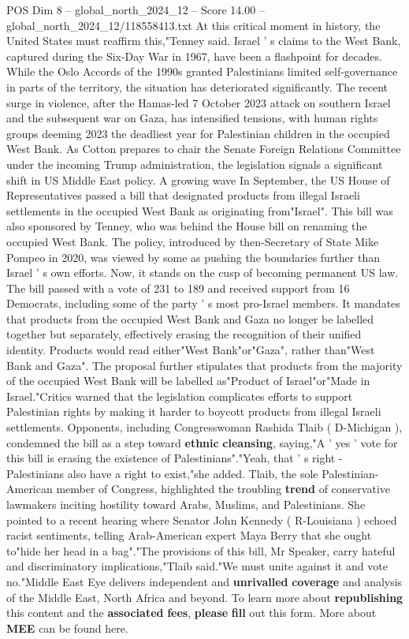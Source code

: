 \begin{textsample}{POS Dim 8 – global\_north\_2024\_12 – Score 14.00 – global\_north\_2024\_12/118558413.txt}
At this critical moment in history, the United States must reaffirm this,"Tenney said.
Israel ' s claims to the West Bank, captured during the Six-Day War in 1967, have been a flashpoint for decades.
While the Oslo Accords of the 1990s granted Palestinians limited self-governance in parts of the territory, the situation has deteriorated significantly.
The recent surge in violence, after the Hamas-led 7 October 2023 attack on southern Israel and the subsequent war on Gaza, has intensified tensions, with human rights groups deeming 2023 the deadliest year for Palestinian children in the occupied West Bank.
As Cotton prepares to chair the Senate Foreign Relations Committee under the incoming Trump administration, the legislation signals a significant shift in US Middle East policy.
A growing wave In September, the US House of Representatives passed a bill that designated products from illegal Israeli settlements in the occupied West Bank as originating from"Israel".
This bill was also sponsored by Tenney, who was behind the House bill on renaming the occupied West Bank.
The policy, introduced by then-Secretary of State Mike Pompeo in 2020, was viewed by some as pushing the boundaries further than Israel ' s own efforts.
Now, it stands on the cusp of becoming permanent US law.
The bill passed with a vote of 231 to 189 and received support from 16 Democrats, including some of the party ' s most pro-Israel members.
It mandates that products from the occupied West Bank and Gaza no longer be labelled together but separately, effectively erasing the recognition of their unified identity.
Products would read either"West Bank"or"Gaza", rather than"West Bank and Gaza".
The proposal further stipulates that products from the majority of the occupied West Bank will be labelled as"Product of Israel"or"Made in Israel."Critics warned that the legislation complicates efforts to support Palestinian rights by making it harder to boycott products from illegal Israeli settlements.
Opponents, including Congresswoman Rashida Tlaib ( D-Michigan ), condemned the bill as a step toward \textbf{ethnic} \textbf{cleansing}, saying,"A ' yes ' vote for this bill is erasing the existence of Palestinians"."Yeah, that ' s right - Palestinians also have a right to exist,"she added.
Tlaib, the sole Palestinian-American member of Congress, highlighted the troubling \textbf{trend} of conservative lawmakers inciting hostility toward Arabs, Muslims, and Palestinians.
She pointed to a recent hearing where Senator John Kennedy ( R-Louisiana ) echoed racist sentiments, telling Arab-American expert Maya Berry that she ought to"hide her head in a bag"."The provisions of this bill, Mr Speaker, carry hateful and discriminatory implications,"Tlaib said."We must unite against it and vote no."Middle East Eye delivers independent and \textbf{unrivalled} \textbf{coverage} and analysis of the Middle East, North Africa and beyond.
To learn more about \textbf{republishing} this content and the \textbf{associated} \textbf{fees}, \textbf{please} \textbf{fill} out this form.
More about \textbf{MEE} can be found here.


\end{textsample}
